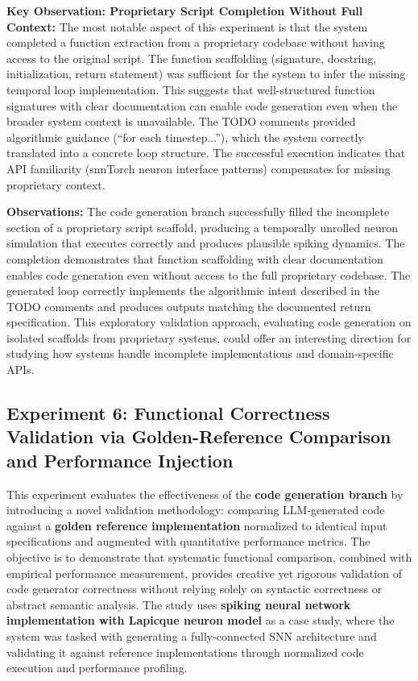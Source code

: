 \vspace{0.3cm}

\noindent \textbf{Key Observation: Proprietary Script Completion Without Full Context:} The most notable aspect of this experiment is that the system completed a function extraction from a proprietary codebase without having access to the original script. The function scaffolding (signature, docstring, initialization, return statement) was sufficient for the system to infer the missing temporal loop implementation. This suggests that well-structured function signatures with clear documentation can enable code generation even when the broader system context is unavailable. The TODO comments provided algorithmic guidance (``for each timestep...''), which the system correctly translated into a concrete loop structure. The successful execution indicates that API familiarity (snnTorch neuron interface patterns) compensates for missing proprietary context.

\vspace{0.3cm}

\noindent \textbf{Observations:} The code generation branch successfully filled the incomplete section of a proprietary script scaffold, producing a temporally unrolled neuron simulation that executes correctly and produces plausible spiking dynamics. The completion demonstrates that function scaffolding with clear documentation enables code generation even without access to the full proprietary codebase. The generated loop correctly implements the algorithmic intent described in the TODO comments and produces outputs matching the documented return specification. This exploratory validation approach, evaluating code generation on isolated scaffolds from proprietary systems, could offer an interesting direction for studying how systems handle incomplete implementations and domain-specific APIs.



\subsection{Experiment 6: Functional Correctness Validation via Golden-Reference Comparison and Performance Injection}

This experiment evaluates the effectiveness of the \textbf{code generation branch} by introducing a novel validation methodology: comparing LLM-generated code against a \textbf{golden reference implementation} normalized to identical input specifications and augmented with quantitative performance metrics. The objective is to demonstrate that systematic functional comparison, combined with empirical performance measurement, provides creative yet rigorous validation of code generator correctness without relying solely on syntactic correctness or abstract semantic analysis. The study uses \textbf{spiking neural network implementation with Lapicque neuron model} as a case study, where the system was tasked with generating a fully-connected SNN architecture and validating it against reference implementations through normalized code execution and performance profiling.

